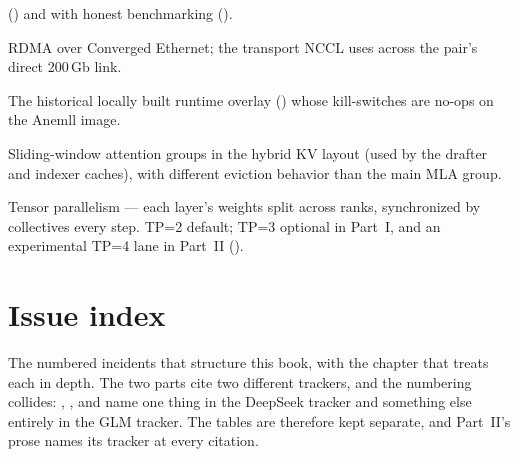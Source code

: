 \begin{description}
    () and with honest benchmarking ().
  \item[RoCE v2] RDMA over Converged Ethernet; the transport NCCL uses
    across the pair's direct 200\,Gb link.
  \item[Stage-C] The historical locally built runtime overlay
    () whose
     kill-switches are no-ops on the Anemll image.
  \item[SWA] Sliding-window attention groups in the hybrid KV layout (used
    by the drafter and indexer caches), with different eviction behavior
    than the main MLA group.
  \item[TP] Tensor parallelism --- each layer's weights split across ranks,
    synchronized by collectives every step. TP=2 default; TP=3 optional in
    Part~I, and an experimental TP=4 lane in Part~II
    ().
\end{description}

\section*{Issue index}

The numbered incidents that structure this book, with the chapter that treats
each in depth. The two parts cite two different trackers, and the numbering
collides: , , and  name one thing in the
DeepSeek tracker and something else entirely in the GLM tracker. The tables
are therefore kept separate, and Part~II's prose names its tracker at every
citation.

